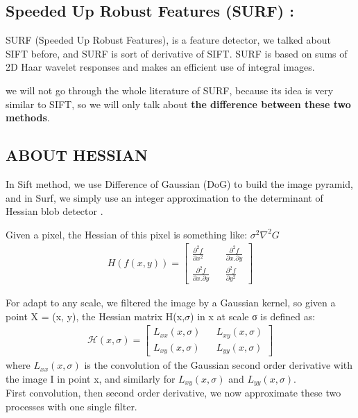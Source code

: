 \subsection{Speeded Up Robust Features (SURF) :}
SURF (Speeded Up Robust Features), is a feature detector, we talked about SIFT before, and SURF is sort of derivative of SIFT. SURF is based on sums of 2D Haar wavelet responses and makes an efficient use of integral images.

we will not go through  the whole literature  of SURF, because its idea is very similar to SIFT, so we will only talk about \textbf{the difference between these two methods}.

\subsection{ABOUT HESSIAN}
In Sift method, we use Difference of Gaussian (DoG) to build the image pyramid, and in Surf, we simply use an integer approximation to the determinant of Hessian blob detector .

Given a pixel, the Hessian of this pixel is something like:
$\sigma^2\nabla^2G$ \\

\begin{gather}
H(f(x,y)) =
\begin{bmatrix}
                 {\frac {\partial^2 f} {\partial x^2}} && { \frac {\partial^2 f} {\partial x.\partial y} }\\
                 {\frac  {\partial^2 f}{\partial x.\partial y}} && { \frac {\partial^2 f} {\partial y^2}}
\end{bmatrix}
\end{gather}

For adapt to any scale, we filtered the image by a Gaussian kernel, so given a point X = (x, y), the Hessian matrix H(x,$\sigma$) in x at scale σ is defined as:
\begin{gather}
 \mathcal{H}(x,\sigma) =
\begin{bmatrix}
                 {L_{xx}(x,\sigma)}  && {L_{xy}(x,\sigma)} \\
                 {L_{xy}(x,\sigma)} && {L_{yy}(x,\sigma)}
\end{bmatrix}
\end{gather}
where ${L_{xx}(x,\sigma)}$ is the convolution of the Gaussian second order derivative with the image I in point x, and similarly for ${L_{xy}(x,\sigma)}$ and ${L_{yy}(x,\sigma)}$.\\
First convolution, then second order derivative, we now approximate these two processes with one single filter.\\


